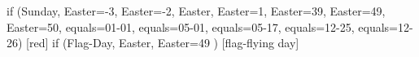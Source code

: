 \documentclass[paper=landscape]{scrartcl}
\begin{document}
\PrintFantasyCalendarYear
  [
    , day text = {}
    , note font = {\color{black}}
    , box outer sep = 5pt
    , box = { rounded corners }
    , phantom days
  ]
  {\the\year}
  {
  if (Sunday,
      Easter=-3, %
      Easter=-2, %
      Easter,    %
      Easter=1,  %
      Easter=39, %
      Easter=49, %
      Easter=50, %
      equals=01-01,
      equals=05-01,
      equals=05-17,
      equals=12-25,
      equals=12-26) [red]
  if (Flag-Day,
      Easter,
      Easter=49
      ) [flag-flying day]
  }
\end{document}
